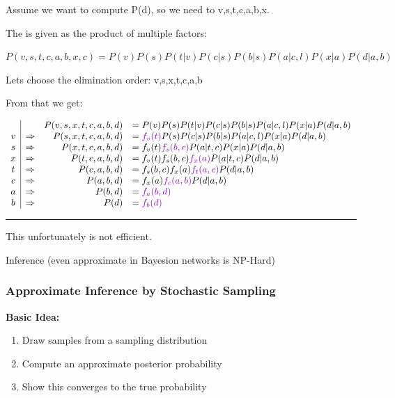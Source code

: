 \documentclass[
../../EiKI_Summary.tex,
]
{subfiles}
\begin{document}
Assume we want to compute P(d), so we need to  v,s,t,c,a,b,x.

The  is given as the product of multiple factors:

\begin{csmb*}
    $P(v,s,t,c,a,b,x,c) = P(v)P(s)P(t|v)P(c|s)P(b|s)P(a|c,l)P(x|a)P(d|a,b)$
\end{csmb*}

Lets choose the elimination order: v,s,x,t,c,a,b

From that we get:

\begin{csmb*}
    $\begin{array}{c|c r l}
        && P(v,s,x,t,c,a,b,d) &= P(v)P(s)P(t|v)P(c|s)P(b|s)P(a|c,l)P(x|a)P(d|a,b)\\
        v&\Rightarrow & P(s,x,t,c,a,b,d) &= \defco{f_v(t)}P(s)P(c|s)P(b|s)P(a|c,l)P(x|a)P(d|a,b)\\
        s&\Rightarrow & P(x,t,c,a,b,d) &= f_v(t)\defco{f_s(b,c)}P(a|t,c)P(x|a)P(d|a,b)\\
        x&\Rightarrow & P(t,c,a,b,d) &= f_v(t)f_s(b,c)\defco{f_x(a)}P(a|t,c)P(d|a,b)\\
        t&\Rightarrow & P(c,a,b,d) &= f_s(b,c)f_x(a)\defco{f_t(a,c)}P(d|a,b)\\
        c&\Rightarrow & P(a,b,d) &= f_x(a)\defco{f_c(a,b)}P(d|a,b)\\
        a&\Rightarrow & P(b,d) &= \defco{f_a(b,d)}\\
        b&\Rightarrow & P(d) &= \defco{f_b(d)}\\
    \end{array}$
\end{csmb*}

\hrule

This unfortunately is not efficient. 

\begin{center}
    \begin{smalldefbox}
        [Theorem]
        Inference (even approximate in Bayesion networks is NP-Hard)
    \end{smalldefbox}
\end{center}

\subsubsection{Approximate Inference by Stochastic Sampling}
\textbf{Basic Idea:}
\begin{enumerate}
    \item Draw  samples from a sampling distribution 
    \item Compute an approximate posterior probability 
    \item Show this converges to the true probability 
\end{enumerate}
\end{document}
